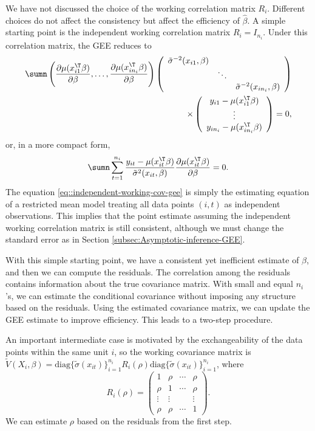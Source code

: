 We have not discussed the choice of the working correlation matrix
$R_i$. Different choices do not affect the consistency
but affect the efficiency of $\hat{\beta}$. A simple starting point
is the independent working correlation matrix $R_i = I_{n_i}$.
Under this correlation matrix, the GEE reduces to
\begin{eqnarray*}
\sumn \left(  \frac{ \partial  \mu(x_{i1}^{\T}\beta)}{\partial \beta},\ldots,  \frac{ \partial   \mu(x_{in_{i}}^{\T}\beta)}{\partial \beta} \right) 
\left(\begin{array}{ccc}
\tilde{\sigma}^{-2}(x_{i1}, \beta)\\
 & \ddots\\
 &  & \tilde{\sigma}^{-2}(x_{in_{i}}, \beta)
\end{array}\right) \\
\times 
\left(\begin{array}{c}
 y_{i1} -\mu(x_{i1}^{\T}\beta)\\
\vdots\\
 y_{in_{i}} -\mu(x_{in_{i}}^{\T}\beta)
\end{array}\right) =0,
\end{eqnarray*}
or, in a  more compact form,
\begin{eqnarray}
\label{eq::independent-working-cov-gee}
\sumn\sum_{t=1}^{n_{i}}\frac{y_{it}-\mu(x_{it}^{\T}\beta)}{\tilde{\sigma}^{2}(x_{it}, \beta)}\frac{\partial\mu(x_{it}^{\T}\beta)}{\partial\beta}=0.
\end{eqnarray}
The equation \eqref{eq::independent-working-cov-gee} is simply the estimating equation of a restricted mean model
treating all data points $(i,t)$ as independent observations. This
implies that the point estimate assuming the independent working correlation matrix is still consistent, although we must change the standard error
as in Section \ref{subsec:Asymptotic-inference-GEE}. 

With this simple starting point, we have a consistent yet inefficient
estimate of $\beta$, and then we can compute the residuals. The correlation
among the residuals contains information about the true covariance
matrix. With small and equal $n_{i}$'s, we can estimate the conditional
covariance without imposing any structure based on the residuals.
Using the estimated covariance matrix, we can update the GEE estimate
to improve efficiency. This leads to a two-step procedure. 

An important intermediate case is motivated by the exchangeability
of the data points within the same unit $i$, so the working covariance
matrix is $\tilde{V}(X_{i}, \beta)= \text{diag}\{\tilde{\sigma}(x_{it})\}_{i=1}^{n_i} R_i(\rho) \text{diag}\{\tilde{\sigma}(x_{it})\}_{i=1}^{n_i} $, where
\[
R_i(\rho) = \left(\begin{array}{cccc}
1 & \rho & \cdots & \rho\\
\rho & 1 & \cdots & \rho\\
\vdots & \vdots &  & \vdots\\
\rho & \rho & \cdots & 1
\end{array}\right) .
\]
We can estimate $\rho$ based on the residuals from the first step.

